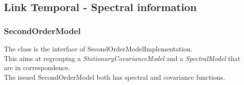\newpage
\subsection{Link Temporal - Spectral information}

\subsubsection{SecondOrderModel}

The class is the interface of SecondOrderModelImplementation. \\
This aims at regrouping a \textit{StationaryCovarianceModel} and a \textit{SpectralModel} that are in correspondence.\\
The issued SecondOrderModel both has spectral and covariance functions. \\ \\

